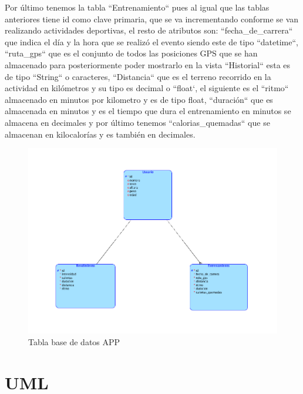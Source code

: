 \documentclass[a4paper, 11pt]{article}
\begin{document}
\begin{itemize}
    Por último tenemos la tabla ``Entrenamiento`` pues al igual que las tablas anteriores tiene id como
    clave primaria, que se va incrementando conforme se van realizando actividades deportivas, el resto
    de atributos son: ``fecha\_de\_carrera`` que indica el día y la hora que se realizó el evento siendo este
    de tipo ``datetime``, ``ruta\_gps`` que es el conjunto de todos las posiciones GPS que se han almacenado
    para posteriormente poder mostrarlo en la vista ``Historial`` esta es de tipo ``String`` o caracteres,
    ``Distancia`` que es el terreno recorrido en la actividad en kilómetros y su tipo es decimal o ``float`,
    el siguiente es el ``ritmo`` almacenado en minutos por kilometro y es de tipo float, ``duración`` que
    es almacenada en minutos y es el tiempo que dura el entrenamiento en minutos se almacena en decimales y
    por último tenemos ``calorias\_quemadas`` que se almacenan en kilocalorías y es también en decimales.\\



        \begin{figure}[H]
         \centering
         \includegraphics[width=1\textwidth]{BD}
         \caption{Tabla base de datos APP}
         \label{f:bd}
        \end{figure}

\section{UML}



\end{itemize}
\end{document}

